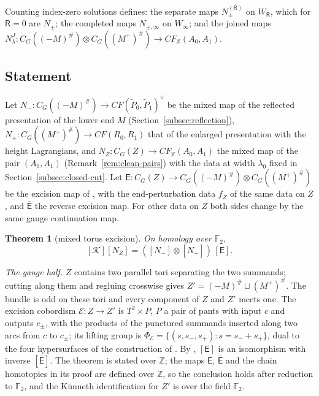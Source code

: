 \documentclass[11pt]{amsart}
\newtheorem{theorem}{Theorem}[section]
\theoremstyle{definition}
\theoremstyle{remark}
\theoremstyle{plain}
\numberwithin{equation}{section}
\newcommand{\ZZ}{\mathbb{Z}}
\newcommand{\FF}{\mathbb{F}_2}
\newcommand{\CF}{\mathit{CF}}
\begin{document}
Counting index-zero solutions defines: the separate maps $N_\pm^{(\mathsf R)}$ on
$W_\mathsf R$, which for $\mathsf R=0$ are $N_\pm$; the completed maps $N_{\pm,\infty}$ on
$W_\infty$; and the joined maps
$N^J_\lambda\colon C_G((-M)^\#)\otimes C_G((M^+)^\#)\to\CF_{\mathbb X}(A_0,A_1)$.

\subsection{Statement}

Let $N_-\colon C_G((-M)^\#)\to\CF(\widetilde P_0,\widetilde P_1)^\vee$ be the mixed map
of the reflected presentation of the lower end $M$ (Section~\ref{subsec:reflection}),
$N_+\colon C_G((M^+)^\#)\to\CF(R_0,R_1)$ that of the enlarged presentation with the height Lagrangians, and $N_Z\colon C_G(Z)\to\CF_{\mathbb X}(A_0,A_1)$ the mixed map of the
pair $(A_0,A_1)$ (Remark~\ref{rem:clean-pairs}) with the data at width $\lambda_0$ fixed in Section~\ref{subsec:closed-cut}. Let $\mathsf E\colon C_G(Z)\to
C_G((-M)^\#)\otimes C_G((M^+)^\#)$ be the excision map of
\cite[Theorem~5.6]{KM-unknot}, with the end-perturbation data $f_Z$ of the same data on $Z$, and $\overline{\mathsf E}$ the reverse excision map. For other data on $Z$ both
sides change by the same gauge continuation map.

\begin{theorem}[mixed torus excision]\label{thm:excision}
On homology over $\FF$,
\[
[\mathcal K][N_Z]=([N_-]\otimes[N_+])\,[\mathsf E].
\]
\end{theorem}

\emph{The gauge half.} $Z$ contains two parallel tori separating the two
summands; cutting along them and regluing crosswise gives
$Z'=(-M)^\#\sqcup(M^+)^\#$. The bundle is odd on these tori and every component
of $Z$ and $Z'$ meets one. The excision cobordism $\mathcal E\colon Z\to Z'$ is
$T^2\times P$, $P$ a pair of pants with input $c$ and outputs $c_\pm$, with the
products of the punctured summands inserted along two arcs from $c$ to $c_\pm$;
its lifting group is $\Phi_{\mathcal E}=\{(s,s_-,s_+):s=s_-+s_+\}$, dual to the
four hypersurfaces of the construction of \cite[Section~5.3]{KM-unknot}. By
\cite[Theorem~5.6]{KM-unknot}, $[\mathsf E]$ is an isomorphism with inverse
$[\overline{\mathsf E}]$. The theorem is stated over $\ZZ$; the maps $\mathsf E$, $\overline{\mathsf E}$ and
the chain homotopies in its proof are defined over $\ZZ$, so the conclusion
holds after reduction to $\FF$, and the
Künneth identification for $Z'$ is over the field $\FF$.
\end{document}
